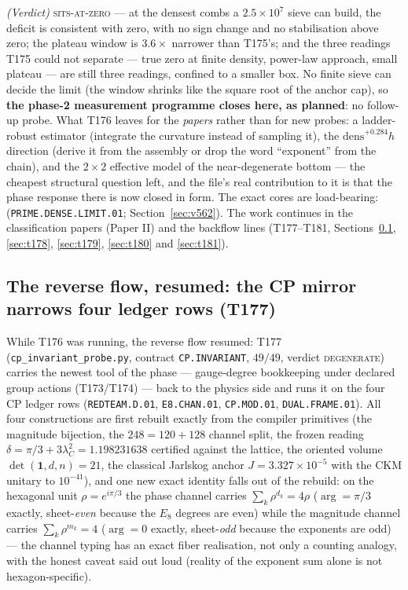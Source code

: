 \documentclass[11pt,a4paper]{article}
\begin{document}
\begin{keybox}
\emph{(Verdict)} \textsc{sits-at-zero} --- at the densest combs a
$2.5\times10^{7}$ sieve can build, the deficit is consistent with
zero, with no sign change and no stabilisation above zero; the
plateau window is $3.6\times$ narrower than T175's; and the three
readings T175 could not separate --- true zero at finite density,
power-law approach, small plateau --- are still three readings,
confined to a smaller box. No finite sieve can decide the limit (the
window shrinks like the square root of the anchor cap), so
\textbf{the phase-2 measurement programme closes here, as planned}:
no follow-up probe. What T176 leaves for the \emph{papers} rather
than for new probes: a ladder-robust estimator (integrate the
curvature instead of sampling it), the $\mathrm{dens}^{+0.284}h$
direction (derive it from the assembly or drop the word ``exponent''
from the chain), and the $2\times2$ effective model of the
near-degenerate bottom --- the cheapest structural question left,
and the file's real contribution to it is that the phase response
there is now closed in form. The exact cores are load-bearing:
 (\texttt{PRIME.DENSE.LIMIT.01};
Section~\ref{sec:v562}). The work continues in the classification
papers (Paper II) and the backflow lines (T177--T181,
Sections~\ref{sec:t177}, \ref{sec:t178}, \ref{sec:t179}, \ref{sec:t180} and \ref{sec:t181}).
\end{keybox}

\subsection{The reverse flow, resumed: the CP mirror narrows four ledger rows (T177)}\label{sec:t177}
While T176 was running, the reverse flow resumed: T177 (\texttt{cp\_invariant\_probe.py}, contract
\texttt{CP.INVARIANT}, $49/49$, verdict \textsc{degenerate}) carries the newest tool of the
phase --- gauge-degree bookkeeping under declared group actions (T173/T174) --- back to the
physics side and runs it on the four CP ledger rows (\texttt{REDTEAM.D.01},
\texttt{E8.CHAN.01}, \texttt{CP.MOD.01}, \texttt{DUAL.FRAME.01}). All four constructions are
first rebuilt exactly from the compiler primitives (the magnitude bijection, the
$248=120+128$ channel split, the frozen reading $\delta=\pi/3+3\lambda_C^2=1.198231638$
certified against the lattice, the oriented volume $\det(\mathbf1,d,n)=21$, the classical
Jarlskog anchor $J=3.327\times10^{-5}$ with the CKM unitary to $10^{-41}$), and one new
exact identity falls out of the rebuild: on the hexagonal unit $\rho=e^{i\pi/3}$ the phase
channel carries $\sum_k\rho^{d_k}=4\rho$ ($\arg=\pi/3$ exactly, sheet-\emph{even} because
the $E_8$ degrees are even) while the magnitude channel carries $\sum_k\rho^{m_k}=4$
($\arg=0$ exactly, sheet-\emph{odd} because the exponents are odd) --- the channel typing
has an exact fiber realisation, not only a counting analogy, with the honest caveat said out
loud (reality of the exponent sum alone is not hexagon-specific).
\end{document}
